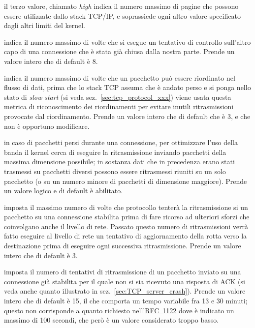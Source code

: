\begin{basedescript}{\desclabelwidth{2.2cm}\desclabelstyle{\nextlinelabel}}
\begin{itemize*}
  \item il terzo valore, chiamato \textit{high} indica il numero massimo di
    pagine che possono essere utilizzate dallo stack TCP/IP, e soprassiede
    ogni altro valore specificato dagli altri limiti del kernel.
  \end{itemize*}

\item[\sysctlrelfiled{net/ipv4}{tcp\_orphan\_retries}] indica il numero
  massimo di volte che si esegue un tentativo di controllo sull'altro capo di
  una connessione che è stata già chiusa dalla nostra parte. Prende un valore
  intero che di default è 8.

\item[\sysctlrelfiled{net/ipv4}{tcp\_reordering}] indica il numero
  massimo di volte che un pacchetto può essere riordinato nel flusso di dati,
  prima che lo stack TCP assuma che è andato perso e si ponga nello stato di
  \textit{slow start} (si veda sez.~\ref{sec:tcp_protocol_xxx}) viene usata
  questa metrica di riconoscimento dei riordinamenti per evitare inutili
  ritrasmissioni provocate dal riordinamento. Prende un valore intero che di
  default che è 3, e che non è opportuno modificare.

\item[\sysctlrelfiled{net/ipv4}{tcp\_retrans\_collapse}] in caso di
  pacchetti persi durante una connessione, per ottimizzare l'uso della banda
  il kernel cerca di eseguire la ritrasmissione inviando pacchetti della
  massima dimensione possibile; in sostanza dati che in precedenza erano stati
  trasmessi su pacchetti diversi possono essere ritrasmessi riuniti su un solo
  pacchetto (o su un numero minore di pacchetti di dimensione
  maggiore). Prende un valore logico e di default è abilitato.

\item[\sysctlrelfiled{net/ipv4}{tcp\_retries1}] imposta il massimo
  numero di volte che protocollo tenterà la ritrasmissione si un pacchetto su
  una connessione stabilita prima di fare ricorso ad ulteriori sforzi che
  coinvolgano anche il livello di rete. Passato questo numero di
  ritrasmissioni verrà fatto eseguire al livello di rete un tentativo di
  aggiornamento della rotta verso la destinazione prima di eseguire ogni
  successiva ritrasmissione. Prende un valore intero che di default è 3.

\item[\sysctlrelfiled{net/ipv4}{tcp\_retries2}] imposta il numero di
  tentativi di ritrasmissione di un pacchetto inviato su una connessione già
  stabilita per il quale non si sia ricevuto una risposta di ACK (si veda
  anche quanto illustrato in sez.~\ref{sec:TCP_server_crash}). Prende un
  valore intero che di default è 15, il che comporta un tempo variabile fra 13
  e 30 minuti; questo non corrisponde a quanto richiesto
  nell'\href{http://www.ietf.org/rfc/rfc1122.txt}{RFC~1122} dove è indicato un
  massimo di 100 secondi, che però è un valore considerato troppo basso.


\end{basedescript}
